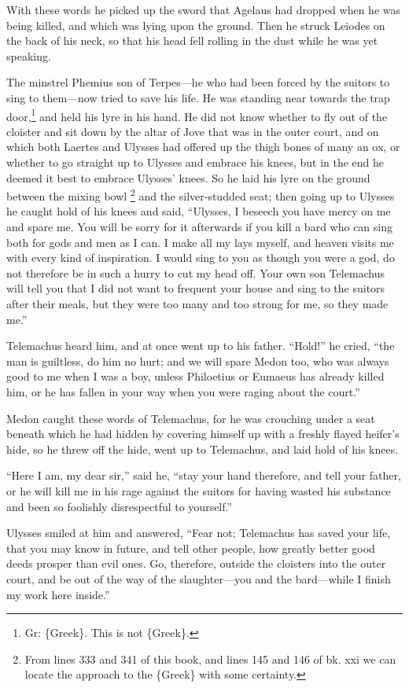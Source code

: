 With these words he picked up the sword that Agelaus had dropped when he was
being killed, and which was lying upon the ground. Then he struck Leiodes on
the back of his neck, so that his head fell rolling in the dust while he was
yet speaking.

The minstrel Phemius son of Terpes—he who had been forced by the suitors to
sing to them—now tried to save his life. He was standing near towards the trap
door,\footnote{Gr: \{Greek\}. This is not \{Greek\}.} and
held his lyre in his hand. He did not know whether to fly out of the cloister
and sit down by the altar of Jove that was in the outer court, and on which
both Laertes and Ulysses had offered up the thigh bones of many an ox, or
whether to go straight up to Ulysses and embrace his knees, but in the end he
deemed it best to embrace Ulysses’ knees. So he laid his lyre on the ground
between the mixing bowl \footnote{From lines 333 and 341 of this book, and lines 145 and 146 of bk. xxi we can
locate the approach to the \{Greek\} with some certainty.} and the silver-studded seat; then
going up to Ulysses he caught hold of his knees and said, “Ulysses, I beseech
you have mercy on me and spare me. You will be sorry for it afterwards if you
kill a bard who can sing both for gods and men as I can. I make all my lays
myself, and heaven visits me with every kind of inspiration. I would sing to
you as though you were a god, do not therefore be in such a hurry to cut my
head off. Your own son Telemachus will tell you that I did not want to frequent
your house and sing to the suitors after their meals, but they were too many
and too strong for me, so they made me.”

Telemachus heard him, and at once went up to his father. “Hold!” he cried, “the
man is guiltless, do him no hurt; and we will spare Medon too, who was always
good to me when I was a boy, unless Philoetius or Eumaeus has already killed
him, or he has fallen in your way when you were raging about the court.”

Medon caught these words of Telemachus, for he was crouching under a seat
beneath which he had hidden by covering himself up with a freshly flayed
heifer’s hide, so he threw off the hide, went up to Telemachus, and laid hold
of his knees.

“Here I am, my dear sir,” said he, “stay your hand therefore, and tell your
father, or he will kill me in his rage against the suitors for having wasted
his substance and been so foolishly disrespectful to yourself.”

Ulysses smiled at him and answered, “Fear not; Telemachus has saved your life,
that you may know in future, and tell other people, how greatly better good
deeds prosper than evil ones. Go, therefore, outside the cloisters into the
outer court, and be out of the way of the slaughter—you and the bard—while I
finish my work here inside.”

